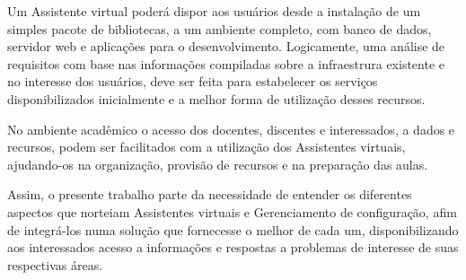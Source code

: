 \documentclass[quali]{mpit}
\begin{document}
Um Assistente virtual poderá dispor aos usuários desde a  instalação de um simples pacote de bibliotecas, a um ambiente completo, com banco de dados, servidor web e aplicações para o desenvolvimento. Logicamente, uma análise de requisitos com base nas informações compiladas sobre a infraestrura existente e no interesse dos usuários, deve ser feita para estabelecer os serviços disponibilizados inicialmente e a melhor forma de utilização desses recursos.

No ambiente acadêmico o acesso dos docentes, discentes e interessados, a dados e recursos, podem ser facilitados com a utilização dos Assistentes virtuais, ajudando-os na organização, provisão de recursos e na preparação das aulas.

Assim, o presente trabalho parte da necessidade de entender os diferentes aspectos que norteiam Assistentes virtuais e Gerenciamento de configuração, afim de integrá-los numa solução que fornecesse o melhor de cada um, disponibilizando aos interessados acesso a informações e respostas a problemas de interesse de suas respectivas áreas.
\end{document}
